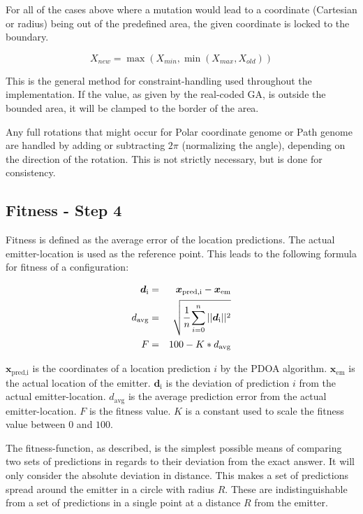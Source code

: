 \documentclass[10pt,a4paper]{book}
\begin{document}
For all of the cases above where a mutation would lead to a coordinate (Cartesian or radius) being out of the predefined area, the given coordinate is locked to the boundary.

\begin{equation}
X_{new} = \max{(X_{min},\min{(X_{max},X_{old})})} \nonumber
\end{equation}

This is the general method for constraint-handling used throughout the implementation. If the value, as given by the real-coded \gls{GA}, is outside the bounded area, it will be clamped to the border of the area. 

Any full rotations that might occur for Polar coordinate genome or Path genome are handled by adding or subtracting $2\pi$ (normalizing the angle), depending on the direction of the rotation. This is not strictly necessary, but is done for consistency.

\subsection{Fitness - Step 4}
\label{MFS4}
Fitness is defined as the average error of the location predictions. The actual emitter-location is used as the reference point. This leads to the following formula for fitness of a configuration:

\begin{eqnarray}
\boldsymbol{d}_\text{i} &=& \boldsymbol{x}_\text{pred,i} - \boldsymbol{x}_\text{em}\nonumber\\
d_\text{avg} &=& \sqrt{\cfrac{1}{n}\sum_{i=0}^{n}{||\boldsymbol{d}_\text{i}}||^2} \nonumber\\
F &=& 100 - K * d_\text{avg}\nonumber
\end{eqnarray}

$\boldsymbol{x}_\text{pred,i}$ is the coordinates of a location prediction $i$ by the \gls{PDOA} algorithm. $\boldsymbol{x}_\text{em}$ is the actual location of the emitter. $\boldsymbol{d}_\text{i}$ is the deviation of prediction $i$ from the actual emitter-location. $d_\text{avg}$ is the average prediction error from the actual emitter-location. $F$ is the fitness value. $K$ is a constant used to scale the fitness value between $0$ and $100$.

The fitness-function, as described, is the simplest possible means of comparing two sets of predictions in regards to their deviation from the exact answer. It will only consider the absolute deviation in distance. This makes a set of predictions spread around the emitter in a circle with radius $R$. These are indistinguishable from a set of predictions in a single point at a distance $R$ from the emitter. 
\end{document}
